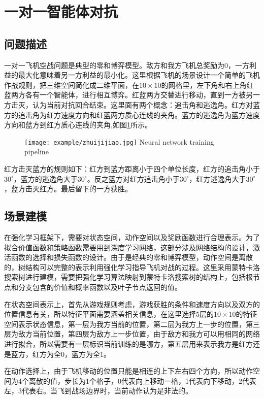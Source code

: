 \section{一对一智能体对抗}
\subsection{问题描述}
一对一飞机空战问题是典型的零和博弈模型。敌方和我方飞机总奖励为0，一方利益的最大化意味着另一方利益的最小化。这里根据飞机的场景设计一个简单的飞机作战规则，把三维空间简化成二维平面，在$10 \times 10$的网格里，左下角和右上角红蓝两方各有一个智能体，进行相互博弈。红蓝两方交替进行移动，直到一方被另一方击灭，认为当前对抗回合结束。这里面有两个概念：追击角和逃逸角。红方对蓝方的追击角为红方速度方向和红蓝两方质心连线的夹角。蓝方的逃逸角为蓝方速度方向和蓝方到红方质心连线的夹角,如图\ref{fig:zhuijijiao}所示。
\begin{figure}[htbp]
	\centering
	\texttt{[image: example/zhuijijiao.jpg]}
	{Neural network training pipeline}
	\label{fig:zhuijijiao}
\end{figure}

红方击灭蓝方的规则如下：红方到蓝方距离小于四个单位长度，红方的追击角小于$30^\circ$，蓝方的逃逸角大于$30^\circ$。反之蓝方对红方追击角小于$30^\circ$，红方逃逸角大于$30^\circ$，蓝方击灭红方。最后留下的一方获胜。

\subsection{场景建模}
在强化学习框架下，需要对状态空间，动作空间以及奖励函数进行合理表示。为了拟合价值函数和策略函数需要用到深度学习网络，这部分涉及网络结构的设计，激活函数的选择和损失函数的设计。由于是经典的零和博弈模型，动作空间是离散的，树结构可以完整的表示利用强化学习指导飞机对战的过程。这里采用蒙特卡洛搜索树进行建模，需要把强化学习算法映射到蒙特卡洛搜索树的结构上，包括根节点和分支包含的价值和概率函数以及叶子节点返回的值。

在状态空间表示上，首先从游戏规则考虑，游戏获胜的条件和速度方向以及双方的位置信息有关，所以特征平面需要涵盖相关信息，在这里选择5层的$10 \times 10$的特征空间表示状态信息，第一层为我方当前的位置，第二层为我方上一步的位置，第三层为敌方当前位置，第四层为敌方上一步位置，由于敌方和我方可以用相同的网络进行拟合，所以需要有一层标识当前训练的是哪方，第五层用来表示我方是红方还是蓝方，红方为全0，蓝方为全1。

在动作选择上，由于飞机移动的位置只能是相连的上下左右四个方向，所以动作空间为4个离散的值，步长为1个格子，0代表向上移动一格，1代表向下移动，2代表左，3代表右。当飞到战场边界时，当前动作认为是非法的。

